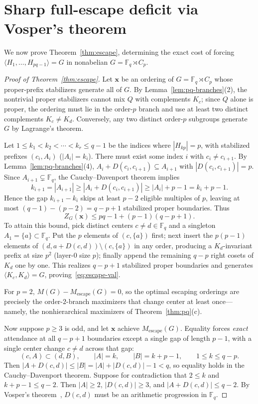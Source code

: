 \documentclass[11pt,reqno]{amsart}
\numberwithin{equation}{section}
\theoremstyle{definition}
\theoremstyle{remark}
\newcommand{\F}{\mathbb{F}}
\newcommand{\Mesc}{M_{\mathrm{escape}}}
\begin{document}
\section{Sharp full-escape deficit via Vosper's theorem}
\label{sec:escape}

We now prove Theorem~\ref{thm:escape}, determining the exact cost of forcing $\langle H_1,\ldots,H_{pq-1}\rangle = G$ in nonabelian $G=\F_q\rtimes C_p$.

\begin{proof}[Proof of Theorem~\ref{thm:escape}]
Let $\mathbf{x}$ be an ordering of $G=\F_q\rtimes C_p$ whose proper-prefix stabilizers generate all of $G$. By Lemma~\ref{lem:pq-branches}(2), the nontrivial proper stabilizers cannot mix $Q$ with complements $K_c$; since $Q$ alone is proper, the ordering must lie in the order-$p$ branch and use at least two distinct complements $K_c\neq K_d$. Conversely, any two distinct order-$p$ subgroups generate $G$ by Lagrange's theorem.

Let $1\le k_1 < k_2 < \cdots < k_r \le q-1$ be the indices where $|H_{kp}|=p$, with stabilized prefixes $(c_i,A_i)$ ($|A_i|=k_i$). There must exist some index $i$ with $c_i\neq c_{i+1}$. By Lemma~\ref{lem:pq-branches}(4), $A_i + D(c_i,c_{i+1})\subseteq A_{i+1}$ with $|D(c_i,c_{i+1})|=p$. Since $A_{i+1}\subsetneq \F_q$, the Cauchy--Davenport theorem implies
\[
k_{i+1} = |A_{i+1}| \ge |A_i + D(c_i,c_{i+1})| \ge |A_i| + p - 1 = k_i + p - 1.
\]
Hence the gap $k_{i+1}-k_i$ skips at least $p-2$ eligible multiples of $p$, leaving at most $(q-1)-(p-2)=q-p+1$ stabilized proper boundaries. Thus
\[
Z_G(\mathbf{x}) \le pq - 1 + (p-1)(q-p+1).
\]
To attain this bound, pick distinct centers $c\neq d\in\F_q$ and a singleton $A_1=\{a\}\subset\F_q$. Put the $p$ elements of $(c,\{a\})$ first; next insert the $p(p-1)$ elements of $(d, a+D(c,d))\setminus (c,\{a\})$ in any order, producing a $K_d$-invariant prefix at size $p^2$ (layer-$0$ size $p$); finally append the remaining $q-p$ right cosets of $K_d$ one by one. This realizes $q-p+1$ stabilized proper boundaries and generates $\langle K_c,K_d\rangle = G$, proving~\eqref{eq:escape-val}.

For $p=2$, $M(G)-\Mesc(G)=0$, so the optimal escaping orderings are precisely the order-$2$-branch maximizers that change center at least once---namely, the nonhierarchical maximizers of Theorem~\ref{thm:pq}(c).

Now suppose $p\ge 3$ is odd, and let $\mathbf{x}$ achieve $\Mesc(G)$. Equality forces \emph{exact} attendance at all $q-p+1$ boundaries except a single gap of length $p-1$, with a single center change $c\neq d$ across that gap:
\[
(c,A) \subset (d,B),\qquad |A|=k,\qquad |B|=k+p-1,\qquad 1\le k\le q-p.
\]
Then $|A + D(c,d)| \le |B| = |A| + |D(c,d)| - 1 < q$, so equality holds in the Cauchy--Davenport theorem. Suppose for contradiction that $2\le k$ and $k+p-1\le q-2$. Then $|A|\ge 2$, $|D(c,d)|\ge 3$, and $|A+D(c,d)|\le q-2$. By Vosper's theorem~\cite{Vos56}, $D(c,d)$ must be an arithmetic progression in $\F_q$.


\end{proof}
\end{document}
